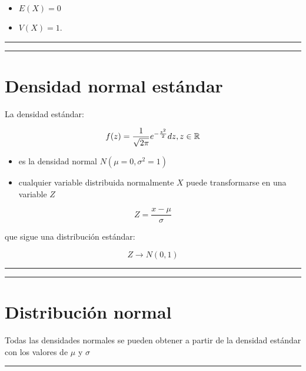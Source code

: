 \documentclass[
]{book}
\begin{document}
\begin{itemize}
\item
  \(E(X) = 0\)
\item
  \(V (X) =1\).
\end{itemize}

\begin{center}\rule{0.5\linewidth}{0.5pt}\end{center}

\begin{center}\rule{0.5\linewidth}{0.5pt}\end{center}

\hypertarget{densidad-normal-estuxe1ndar-2}{%
\section{Densidad normal estándar}\label{densidad-normal-estuxe1ndar-2}}

La densidad estándar:

\[f(z)=\frac{1}{\sqrt{2\pi}}e^{-\frac{z^2}{2}} dz,z \in {\Bbb R}\]

\begin{itemize}
\item
  es la densidad normal \(N(\mu=0,\sigma^2=1)\)
\item
  cualquier variable distribuida normalmente \(X\) puede transformarse en una variable \(Z\)
\end{itemize}

\[Z=\frac{x-\mu}{\sigma}\]

que sigue una distribución estándar:

\[Z \rightarrow N(0,1)\]

\begin{center}\rule{0.5\linewidth}{0.5pt}\end{center}

\begin{center}\rule{0.5\linewidth}{0.5pt}\end{center}

\hypertarget{distribuciuxf3n-normal-6}{%
\section{Distribución normal}\label{distribuciuxf3n-normal-6}}

Todas las densidades normales se pueden obtener a partir de la densidad estándar con los valores de \(\mu\) y \(\sigma\)

\begin{center}\rule{0.5\linewidth}{0.5pt}\end{center}
\end{document}

